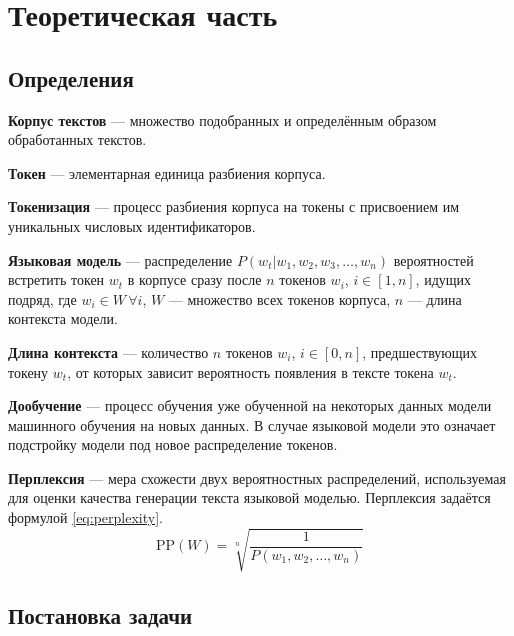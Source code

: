 \chapter{Теоретическая часть}
\label{cha:theory}

\section{Определения}

\textbf{Корпус текстов} --- множество подобранных и определённым образом обработанных текстов.

\textbf{Токен} --- элементарная единица разбиения корпуса.

\textbf{Токенизация} --- процесс разбиения корпуса на токены с присвоением им уникальных числовых идентификаторов.

\textbf{Языковая модель} --- распределение $P(w_t | w_1,w_2,w_3,\dots,w_n)$ вероятностей встретить токен $w_t$ в корпусе сразу после $n$ токенов $w_i$, $i\in[1, n]$, идущих подряд, где $w_i \in W \, \forall i$, $W$ --- множество всех токенов корпуса, $n$ --- длина контекста модели.

\textbf{Длина контекста} --- количество $n$ токенов $w_i$, $i\in[0, n]$, предшествующих токену $w_t$, от которых зависит вероятность появления в тексте токена $w_t$.

\textbf{Дообучение} --- процесс обучения уже обученной на некоторых данных модели машинного обучения на новых данных. В случае языковой модели это означает подстройку модели под новое распределение токенов.

\textbf{Перплексия} --- мера схожести двух вероятностных распределений, используемая для оценки качества генерации текста языковой моделью. Перплексия задаётся формулой \ref*{eq:perplexity}.
\begin{equation}
    \label{eq:perplexity}
    \textrm{PP}(W)=\sqrt[n]{\frac{1}{P(w_1,w_2,\dots,w_n)}}
\end{equation}

\section{Постановка задачи}

